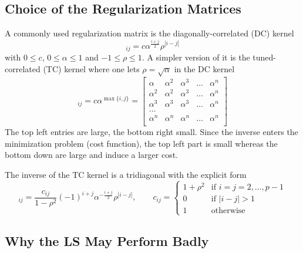 \subsection{Choice of the Regularization Matrices}
\label{sec:regularization-matrices}

A commonly used regularization matrix is the diagonally-correlated (DC) kernel
\begin{equation*}
  [P]_{ij} = c\alpha^{\frac{i+j}{2}}\rho^{|i-j|}
\end{equation*}
with $0 \le c$, $0 \le \alpha \le 1$ and $-1 \le \rho \le 1$. A simpler version of it is the tuned-correlated (TC) kernel where one lets $\rho = \sqrt{\alpha}$ in the DC kernel
\begin{equation*}
  [P]_{ij} = c\alpha^{\max\{i,j\}} =
  \begin{bmatrix}
    \alpha   & \alpha^2 & \alpha^3 & \ldots & \alpha^n \\
    \alpha^2 & \alpha^2 & \alpha^3 & \ldots & \alpha^n \\
    \alpha^3 & \alpha^3 & \alpha^3 & \ldots & \alpha^n \\
    \ldots \\
    \alpha^n & \alpha^n & \alpha^n & \ldots & \alpha^n \\
  \end{bmatrix}
\end{equation*}
The top left entries are large, the bottom right small. Since the inverse enters the minimization problem (cost function), the top left part is small whereas the bottom down are large and induce a larger cost.

The inverse of the TC kernel is a tridiagonal with the explicit form
\begin{equation*}
  [P{-1}]_{ij} = \frac{c_{ij}}{1-\rho^2}(-1)^{i+j}\alpha^{-\frac{i+j}{2}}\rho^{|i-j|},\hspace{2em} c_{ij} =
  \begin{cases}
    1 + \rho^2 & \textrm{if } i=j=2,\ldots,p-1 \\
    0 & \textrm{if } |i-j| > 1 \\
    1 & \textrm{otherwise}
  \end{cases}
\end{equation*}

\subsection{Why the LS May Perform Badly}
\label{sec:LS-illconditioned}

